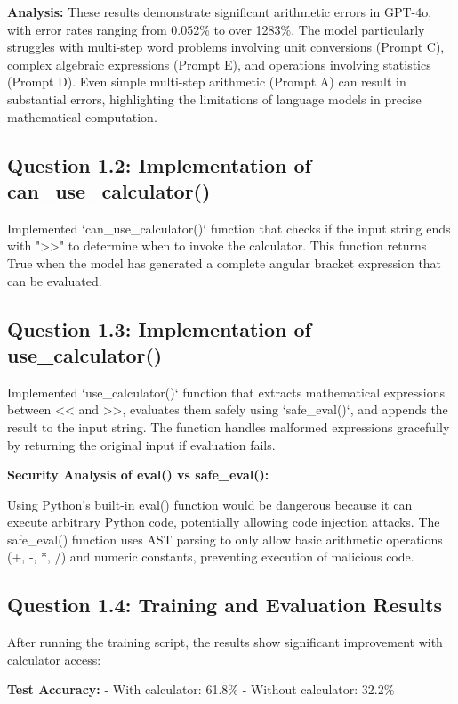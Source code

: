 \documentclass[11pt]{article}
\begin{document}
\textbf{Analysis:} These results demonstrate significant arithmetic errors in GPT-4o, with error rates ranging from 0.052\% to over 1283\%. The model particularly struggles with multi-step word problems involving unit conversions (Prompt C), complex algebraic expressions (Prompt E), and operations involving statistics (Prompt D). Even simple multi-step arithmetic (Prompt A) can result in substantial errors, highlighting the limitations of language models in precise mathematical computation.

\subsection{Question 1.2: Implementation of can\_use\_calculator()}

Implemented `can_use_calculator()` function that checks if the input string ends with ">>" to determine when to invoke the calculator. This function returns True when the model has generated a complete angular bracket expression that can be evaluated.

\subsection{Question 1.3: Implementation of use\_calculator()}

Implemented `use_calculator()` function that extracts mathematical expressions between << and >>, evaluates them safely using `safe_eval()`, and appends the result to the input string. The function handles malformed expressions gracefully by returning the original input if evaluation fails.

\textbf{Security Analysis of eval() vs safe\_eval():}

Using Python's built-in eval() function would be dangerous because it can execute arbitrary Python code, potentially allowing code injection attacks. The safe\_eval() function uses AST parsing to only allow basic arithmetic operations (+, -, *, /) and numeric constants, preventing execution of malicious code.

\subsection{Question 1.4: Training and Evaluation Results}

After running the training script, the results show significant improvement with calculator access:

\textbf{Test Accuracy:}
- With calculator: 61.8\%
- Without calculator: 32.2\%
\end{document}
